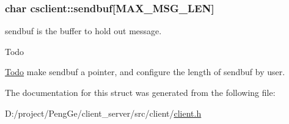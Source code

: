 \subsubsection[{sendbuf}]{\setlength{\rightskip}{0pt plus 5cm}char csclient\+::sendbuf\mbox{[}M\+A\+X\+\_\+\+M\+S\+G\+\_\+\+L\+E\+N\mbox{]}}\label{structcsclient_a325006ca2b5e74fe78e00847974234e5}


sendbuf is the buffer to hold out message. 

\begin{DoxyRefDesc}{Todo}
\item[\hyperlink{todo__todo000001}{Todo}]make sendbuf a pointer, and configure the length of sendbuf by user. \end{DoxyRefDesc}


The documentation for this struct was generated from the following file\+:\begin{DoxyCompactItemize}
\item 
D\+:/project/\+Peng\+Ge/client\+\_\+server/src/client/\hyperlink{client_8h}{client.\+h}\end{DoxyCompactItemize}
